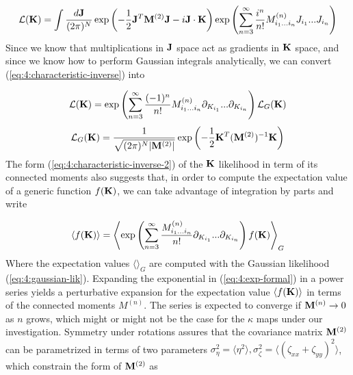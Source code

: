 \begin{equation}
\label{eq:4:characteristic-inverse}
\mathcal{L}(\mathbf{K}) = \int \frac{d\mathbf{J}}{(2\pi)^N}\exp\left(-\frac{1}{2}\mathbf{J}^T\mathbf{M}^{(2)}\mathbf{J}-i\mathbf{J}\cdot\mathbf{K}\right)\exp\left(\sum_{n=3}^\infty\frac{i^n}{n!}M^{(n)}_{i_1...i_n}J_{i_1}...J_{i_n}\right)
\end{equation} 
%
Since we know that multiplications in $\mathbf{J}$ space act as gradients in $\mathbf{K}$ space, and since we know how to perform Gaussian integrals analytically, we can convert (\ref{eq:4:characteristic-inverse}) into  

\begin{equation}
\label{eq:4:characteristic-inverse-2}
\mathcal{L}(\mathbf{K}) = \exp\left(\sum_{n=3}^\infty\frac{(-1)^n}{n!}M^{(n)}_{i_1...i_n}\partial_{K_{i_1}}...\partial_{K_{i_n}}\right)\mathcal{L}_G(\mathbf{K})
\end{equation} 
%
\begin{equation}
\label{eq:4:gaussian-lik}
\mathcal{L}_G(\mathbf{K}) = \frac{1}{\sqrt{(2\pi)^N\vert\mathbf{M}^{(2)}\vert}}\exp\left(-\frac{1}{2}\mathbf{K}^T(\mathbf{M}^{(2)})^{-1}\mathbf{K}\right)
\end{equation}
%
The form (\ref{eq:4:characteristic-inverse-2}) of the $\mathbf{K}$ likelihood in term of its connected moments also suggests that, in order to compute the expectation value of a generic function $f(\mathbf{K})$, we can take advantage of integration by parts and write

\begin{equation}
\label{eq:4:exp-formal}
\langle f(\mathbf{K})\rangle = \left\langle\exp\left(\sum_{n=3}^\infty\frac{M^{(n)}_{i_1...i_n}}{n!}\partial_{K_{i_1}}...\partial_{K_{i_n}}\right)f(\mathbf{K})\right\rangle_G
\end{equation}
%
Where the expectation values $\langle\rangle_G$ are computed with the Gaussian likelihood (\ref{eq:4:gaussian-lik}). Expanding the exponential in (\ref{eq:4:exp-formal}) in a power series yields a perturbative expansion for the expectation value $\langle f(\mathbf{K})\rangle$ in terms of the connected moments $M^{(n)}$. The series is expected to converge if $\mathbf{M}^{(n)}\rightarrow 0$ as $n$ grows, which might or might not be the case for the $\kappa$ maps under our investigation. Symmetry under rotations assures that the covariance matrix $\mathbf{M}^{(2)}$ can be parametrized in terms of two parameters $\sigma^2_\eta=\langle\eta^2\rangle,\sigma^2_\zeta=\langle(\zeta_{xx}+\zeta_{yy})^2\rangle$, which constrain the form of $\mathbf{M}^{(2)}$ as 

